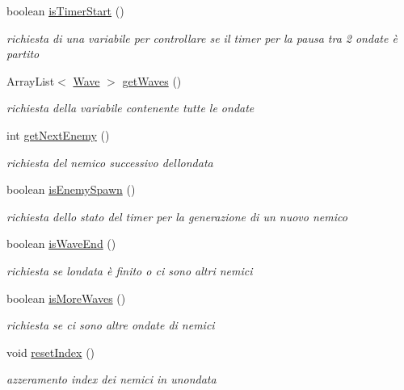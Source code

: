 \begin{DoxyCompactItemize}
boolean \hyperlink{classmanagers_1_1_wave_manager_a6623bf1d5b1d16d74e9dd7e4d1b754f4}{is\+Timer\+Start} ()
\begin{DoxyCompactList}\small\item\em richiesta di una variabile per controllare se il timer per la pausa tra 2 ondate è partito \end{DoxyCompactList}\item 
Array\+List$<$ \hyperlink{classevents_1_1_wave}{Wave} $>$ \hyperlink{classmanagers_1_1_wave_manager_a4b2fc7c5f5464fa508eea5af8be4e805}{get\+Waves} ()
\begin{DoxyCompactList}\small\item\em richiesta della variabile contenente tutte le ondate \end{DoxyCompactList}\item 
int \hyperlink{classmanagers_1_1_wave_manager_aa05f286f626db3fc63273f5c5cd64bca}{get\+Next\+Enemy} ()
\begin{DoxyCompactList}\small\item\em richiesta del nemico successivo dell\textquotesingle{}ondata \end{DoxyCompactList}\item 
boolean \hyperlink{classmanagers_1_1_wave_manager_a121827ebd1c5b24c92f966721b51c0b9}{is\+Enemy\+Spawn} ()
\begin{DoxyCompactList}\small\item\em richiesta dello stato del timer per la generazione di un nuovo nemico \end{DoxyCompactList}\item 
boolean \hyperlink{classmanagers_1_1_wave_manager_a1012ba37c40b76ee9c3413986133d865}{is\+Wave\+End} ()
\begin{DoxyCompactList}\small\item\em richiesta se l\textquotesingle{}ondata è finito o ci sono altri nemici \end{DoxyCompactList}\item 
boolean \hyperlink{classmanagers_1_1_wave_manager_a999f12a033f49f299ad7f55bcae24447}{is\+More\+Waves} ()
\begin{DoxyCompactList}\small\item\em richiesta se ci sono altre ondate di nemici \end{DoxyCompactList}\item 
void \hyperlink{classmanagers_1_1_wave_manager_a73337f83fd9fb6c3398a8cf359422508}{reset\+Index} ()
\begin{DoxyCompactList}\small\item\em azzeramento index dei nemici in un\textquotesingle{}ondata \end{DoxyCompactList}\item 

\end{DoxyCompactItemize}
